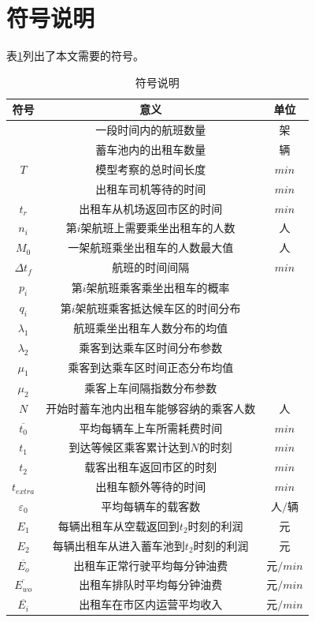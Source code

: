 \documentclass{cumcm}
\begin{document}
\section{符号说明}
表\ref{table-symbol}列出了本文需要的符号。
\begin{table}[H]
	\centering
	\caption{符号说明} 
	\label{table-symbol}
	\begin{tabular*}{0.65\textwidth}{ccc}
		\toprule
		符号 & 意义 & 单位 \\
		\midrule
		\flightnum & 一段时间内的航班数量 & 架 \\
		\taxinum & 蓄车池内的出租车数量 & 辆 \\
		$T$ & 模型考察的总时间长度 & $min$ \\
		\waittime & 出租车司机等待的时间 & $min$ \\
		$t_r$ & 出租车从机场返回市区的时间 & $min$ \\
		$n_i$ & 第$i$架航班上需要乘坐出租车的人数 & 人 \\
		$M_0$ & 一架航班乘坐出租车的人数最大值 & 人 \\
		$\Delta t_f$ & 航班的时间间隔 & $min$ \\
		$p_i$ & 第$i$架航班乘客乘坐出租车的概率 & \\
		$q_i$ & 第$i$架航班乘客抵达候车区的时间分布 & \\
		$\lambda_1$ & 航班乘坐出租车人数分布的均值 & \\
		$\lambda_2$ & 乘客到达乘车区时间分布参数 & \\
		$\mu_1$ & 乘客到达乘车区时间正态分布均值 & \\
		$\mu_2$ & 乘客上车间隔指数分布参数 & \\
		$N$ & 开始时蓄车池内出租车能够容纳的乘客人数 & 人 \\
		$\overline{t_0}$ & 平均每辆车上车所需耗费时间 & $min$ \\
		$t_1$ & 到达等候区乘客累计达到$N$的时刻 & $min$ \\
		$t_2$ & 载客出租车返回市区的时刻 & $min$ \\
		$t_{extra}$ & 出租车额外等待的时间 & $min$ \\
		$\varepsilon_0$ & 平均每辆车的载客数 & 人$/$辆 \\
		$E_1$ & 每辆出租车从空载返回到$t_2$时刻的利润 & 元 \\
		$E_2$ & 每辆出租车从进入蓄车池到$t_2$时刻的利润 & 元 \\
		$\overline{E_o}$ & 出租车正常行驶平均每分钟油费 & 元$/min$ \\
		$\overline{E_{wo}}$ & 出租车排队时平均每分钟油费 & 元$/min$ \\		$\overline{E_i}$ & 出租车在市区内运营平均收入 & 元$/min$ \\

\end{tabular*}
\end{table}
\end{document}
